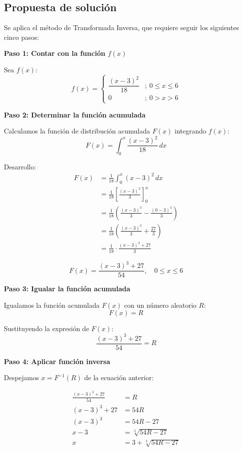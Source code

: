 \subsection{Propuesta de solución}

Se aplica el método de Transformada Inversa, que requiere seguir los siguientes cinco pasos:

\textbf{Paso 1: Contar con la función $f(x)$}

Sea $f(x)$:
\[
f(x)=\begin{cases}\dfrac{(x-3)^2}{18} &;\ 0 \leq x \leq 6 \\ 0 &;\ 0 > x > 6\end{cases}
\]

\textbf{Paso 2: Determinar la función acumulada}

Calculamos la función de distribución acumulada $F(x)$ integrando $f(x)$:
\[F(x) = \int_0^x \frac{(x-3)^2}{18}\, dx\]

Desarrollo:
\begin{align*}
F(x) &= \frac{1}{18} \int_0^x (x-3)^2\, dx \\[4pt]
     &= \frac{1}{18} \left[\frac{(x-3)^3}{3}\right]_0^x \\[4pt]
     &= \frac{1}{18} \left(\frac{(x-3)^3}{3} - \frac{(0-3)^3}{3}\right) \\[4pt]
     &= \frac{1}{18} \left(\frac{(x-3)^3}{3} + \frac{27}{3}\right) \\[4pt]
     &= \frac{1}{18} \cdot \frac{(x-3)^3 + 27}{3}
\end{align*}

\[
\boxed{F(x) = \frac{(x-3)^3 + 27}{54}}, \quad 0 \leq x \leq 6
\]

\textbf{Paso 3: Igualar la función acumulada}

Igualamos la función acumulada $F(x)$ con un número aleatorio $R$:
\[F(x) = R\]

Sustituyendo la expresión de $F(x)$:
\[\frac{(x-3)^3 + 27}{54} = R\]

\textbf{Paso 4: Aplicar función inversa}

Despejamos $x = F^{-1}(R)$ de la ecuación anterior:

\begin{align*}
\frac{(x-3)^3 + 27}{54} &= R \\[4pt]
(x-3)^3 + 27 &= 54R \\[4pt]
(x-3)^3 &= 54R - 27 \\[4pt]
x - 3 &= \sqrt[3]{54R - 27} \\[4pt]
x &= 3 + \sqrt[3]{54R - 27}
\end{align*}

